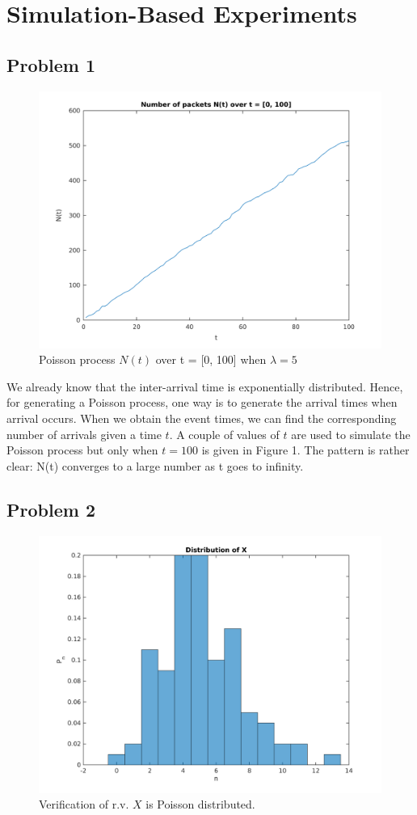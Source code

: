 \documentclass{article}
\begin{document}
\section*{Simulation-Based Experiments}
	\subsection*{Problem 1}
		\begin{figure}[!hbt]
			\centering
			\includegraphics[width=0.5\linewidth]{hw3_1_nt.png}
			\caption{Poisson process $N(t)$ over t = [0, 100] when $\lambda=5$}
		\end{figure}

		We already know that the inter-arrival time is exponentially distributed.
		Hence, for generating a Poisson process, one way is to generate the arrival
		times when arrival occurs. When we obtain the event times, we can find the
		corresponding number of arrivals given a time $t$. A couple of values of $t$
		are used to simulate the Poisson process but only when $t=100$ is given in
		Figure 1. The pattern is rather clear: N(t) converges to a large number as t
		goes to infinity.

	\subsection*{Problem 2}
		\begin{figure}[!hbt]
			\centering
			\includegraphics[width=0.5\linewidth]{hw3_2_pn.png}
			\caption{Verification of r.v. $X$ is Poisson distributed.}
		\end{figure}
\end{document}
